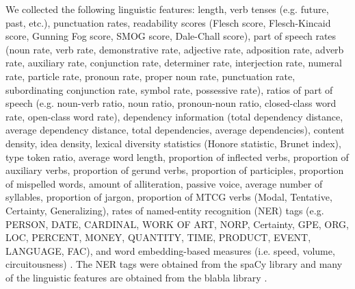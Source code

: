 We collected the following linguistic features: length, verb tenses (e.g. future, past, etc.), punctuation rates, readability scores (Flesch score, Flesch-Kincaid score, Gunning Fog score, SMOG score, Dale-Chall score), part of speech rates (noun rate, verb rate, demonstrative rate, adjective rate, adposition rate, adverb rate, auxiliary rate, conjunction rate, determiner rate, interjection rate, numeral rate, particle rate, pronoun rate, proper noun rate, punctuation rate, subordinating conjunction rate, symbol rate, possessive rate), ratios of part of speech (e.g. noun-verb ratio, noun ratio, pronoun-noun ratio, closed-class word rate, open-class word rate), dependency information (total dependency distance, average dependency distance, total dependencies, average dependencies),  content density, idea density, lexical diversity statistics (Honore statistic, Brunet index), type token ratio, average word length, proportion of inflected verbs, proportion of auxiliary verbs, proportion of gerund verbs, proportion of participles, proportion of mispelled words, amount of alliteration, passive voice, average number of syllables, proportion of jargon, proportion of MTCG verbs (Modal, Tentative, Certainty, Generalizing), rates of named-entity recognition (NER) tags (e.g. PERSON, DATE, CARDINAL, WORK OF ART, NORP, Certainty, GPE, ORG, LOC, PERCENT, MONEY, QUANTITY, TIME, PRODUCT, EVENT, LANGUAGE, FAC), and word embedding-based measures (i.e. speed, volume, circuitousness) \citep{toubia-2021}. The NER tags were obtained from the spaCy library \citep{spacy2} and many of the linguistic features are obtained from the blabla library \citep{shivkumar2020blabla}.
